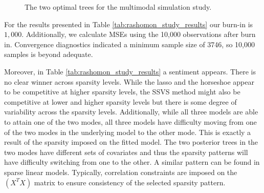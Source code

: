  \begin{figure}[H]
  \begin{center}
\hspace{1cm}
\caption{The two optimal trees for the multimodal simulation study. }
\label{fig:best_two_trees}  
\end{center}
\end{figure}
For the results presented in Table \ref{tab:rashomon_study_results} our burn-in is $1,000$. Additionally, we calculate MSEs using the 10,000 observations after burn in. Convergence diagnostics indicated a minimum sample size of 3746, so 10,000 samples is beyond adequate. 
 
Moreover, in Table \ref{tab:rashomon_study_results} a sentiment appears. There is no clear winner across sparsity levels. While the lasso and the horseshoe appear to be competitive at higher sparsity levels, the SSVS method might also be competitive at lower and higher sparsity levels but there is some degree of variability across the sparsity levels. Additionally, while all three models are able to attain one of the two modes, all three models have difficulty moving from one of the two modes in the underlying model to the other mode. This is exactly a result of the sparsity imposed on the fitted model. The two posterior trees in the two modes have different sets of covariates and thus the sparsity patterns will have difficulty switching from one to the other. A similar pattern can be found in sparse linear models. Typically, correlation constraints are imposed on the $(X^TX)$ matrix to ensure consistency of the selected sparsity pattern. 

